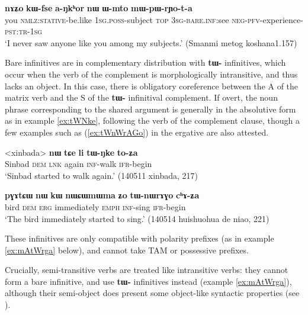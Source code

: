 \documentclass[oneside,a4paper,11pt]{article}
\newcommand{\ipa}[1]{\textbf{\phon#1}} %
\begin{document}
\begin{exe}
\ex \label{ex:Wmto}
\gll \ipa{nɤʑo} 	\ipa{kɯ-fse} 	\ipa{a-ŋkʰor} 	\ipa{nɯ} 	\ipa{ɯ-mto} 	\ipa{mɯ-pɯ-rɲo-t-a} \\
you \textsc{nmlz:stative}-be.like \textsc{1sg.poss}-subject \textsc{top} \textsc{3sg}-\textsc{bare.inf:}see \textsc{neg-pfv}-experience-\textsc{pst:tr-1sg} \\
\glt  `I never saw anyone like you among my subjects.' (Smanmi metog koshana1.157)
\end{exe} 

Bare infinitives are in complementary distribution with \ipa{tɯ-} infinitives,  which occur when the verb of the complement is morphologically intransitive, and thus lacks an object. In this case, there is obligatory coreference between the A of the matrix verb and the S of the \ipa{tɯ-} infinitival complement. If overt, the noun phrase corresponding to the shared argument is generally in the absolutive form as in example \ref{ex:tWNke}, following the verb of the complement clause, though a few examples such as (\ref{ex:tWnWrAGo}) in the ergative are also attested.

\begin{exe}
\ex \label{ex:tWNke}
\gll
<xinbada> 	\ipa{nɯ} 	\ipa{tɕe} 	\ipa{li} 	\ipa{tɯ-ŋke} 	\ipa{to-ʑa} \\
Sinbad \textsc{dem} \textsc{lnk} again  \textsc{inf}-walk \textsc{ifr}-begin \\
\glt `Sinbad started to walk again.' (140511 xinbada, 217)
\end{exe}


\begin{exe}
\ex \label{ex:tWnWrAGo}
\gll \ipa{pɣɤtɕɯ} 	\ipa{nɯ} 	\ipa{kɯ} 	\ipa{nɯɕɯmɯma} 	\ipa{ʑo} 	\ipa{tɯ-nɯrɤɣo} 	\ipa{cʰɤ-ʑa} \\
bird \textsc{dem} \textsc{erg} immediately \textsc{emph} \textsc{inf}-sing \textsc{ifr}-begin \\
\glt `The bird immediately started to sing.' (140514 huishuohua de niao, 221)
\end{exe}

These infinitives are only compatible with polarity prefixes (as in example \ref{ex:mAtWrga} below), and cannot take TAM or possessive prefixes.

Crucially, semi-transitive verbs are treated like intransitive verbs: they cannot form a bare infinitive, and use \ipa{tɯ-} infinitives instead (example \ref{ex:mAtWrga}), although their semi-object does present some object-like syntactic properties (see \citealt{jacques16relatives}).  
\end{document}
